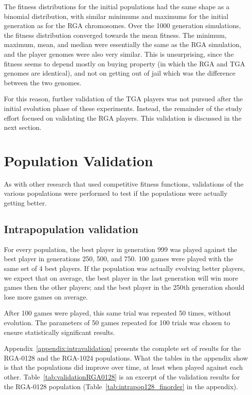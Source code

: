 The fitness distributions for the initial populations had the same shape as a
binomial distribution, with similar minimums and maximums for the initial
generation as for the RGA chromosomes. Over the 1000 generation simulations, the
fitness distribution converged towards the mean fitness. The minimum, maximum,
mean, and median were essentially the same as the RGA simulation, and the player
genomes were also very similar. This is unsurprising, since the fitness seems to
depend mostly on buying property (in which the RGA and TGA genomes are
identical), and not on getting out of jail which was the difference between the
two genomes.

For this reason, further validation of the TGA players was not pursued after
the initial evolution phase of these experiments. Instead, the remainder of the
study effort focused on validating the RGA players. This validation is discussed
in the next section.

\section{Population Validation} \label{6_Validation}

As with other research that used competitive fitness functions, validations of
the various populations were performed to test if the populations were actually
getting better.

\subsection{Intrapopulation validation}\label{6_intraPopValidation}

For every population, the best player in generation 999 was played against
the best player in generations 250, 500, and 750. 100 games were played with the
same set of 4 best players. If the population was actually evolving better
players, we expect that on average, the best player in the last generation will
win more games then the other players; and the best player in the 250th
generation should lose more games on average.

After 100 games were played, this same trial was repeated 50 times, without
evolution. The parameters of 50 games repeated for 100 trials was chosen to
ensure statistically significant results.

Appendix~\ref{appendix:intravalidation} presents the complete set of results for
the RGA-0128 and the RGA-1024 populations. What the tables in the appendix show
is that the populations did improve over time, at least when played against each
other. Table~\ref{tab:validationRGA0128} is an excerpt of the validation results
for the RGA-0128 population (Table~\ref{tab:intrapop128_finorder} in the
appendix).

